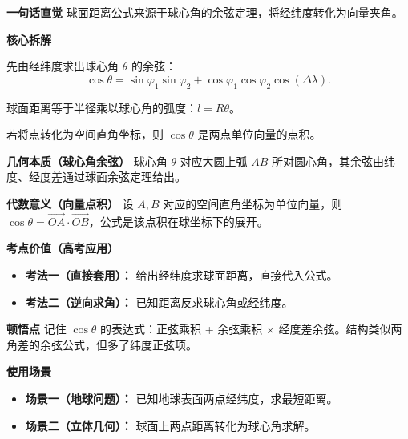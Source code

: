 \begin{explanationbox}
	\textbf{\textcolor{CExplanation}{一句话直觉}}
	球面距离公式来源于球心角的余弦定理，将经纬度转化为向量夹角。

	\medskip
	\textbf{\textcolor{CExplanation}{核心拆解}}
	\begin{description}[style=nextline, leftmargin=2.8em, labelsep=0.5em, itemsep=0.45em]
		\item[\textbf{要点一（球心角计算）：}]
			先由经纬度求出球心角 $\theta$ 的余弦：
			\[
				\cos\theta = \sin\varphi_1\sin\varphi_2 + \cos\varphi_1\cos\varphi_2\cos(\Delta\lambda).
			\]
		\item[\textbf{要点二（弧长转化）：}]
			球面距离等于半径乘以球心角的弧度：$l = R\theta$。
		\item[\textbf{要点三（坐标对应）：}]
			若将点转化为空间直角坐标，则 $\cos\theta$ 是两点单位向量的点积。
	\end{description}

	\medskip
	\textbf{\textcolor{CExplanation}{几何本质（球心角余弦）}}
	球心角 $\theta$ 对应大圆上弧 $AB$ 所对圆心角，其余弦由纬度、经度差通过球面余弦定理给出。

	\medskip
	\textbf{\textcolor{CExplanation}{代数意义（向量点积）}}
	设 $A,B$ 对应的空间直角坐标为单位向量，则 $\cos\theta = \overrightarrow{OA}\cdot\overrightarrow{OB}$，公式是该点积在球坐标下的展开。

	\medskip
	\textbf{\textcolor{CExplanation}{考点价值（高考应用）}}
	\begin{itemize}[leftmargin=*, itemsep=0.5em, topsep=0.4em]
		\item \textbf{考法一（直接套用）：} 给出经纬度求球面距离，直接代入公式。
		\item \textbf{考法二（逆向求角）：} 已知距离反求球心角或经纬度。
	\end{itemize}

	\medskip
	\textbf{\textcolor{CExplanation}{顿悟点}}
	记住 $\cos\theta$ 的表达式：正弦乘积 + 余弦乘积 × 经度差余弦。结构类似两角差的余弦公式，但多了纬度正弦项。

	\medskip
	\textbf{\textcolor{CExplanation}{使用场景}}
	\begin{itemize}[leftmargin=*, itemsep=0.5em, topsep=0.4em]
		\item \textbf{场景一（地球问题）：} 已知地球表面两点经纬度，求最短距离。
		\item \textbf{场景二（立体几何）：} 球面上两点距离转化为球心角求解。
	\end{itemize}

\end{explanationbox}
